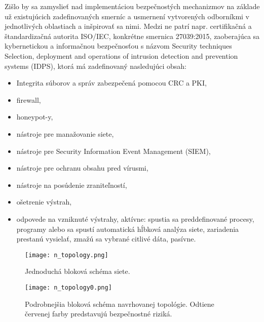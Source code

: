 \documentclass[12pt,a4paper,oneside,openright]{report}
\begin{document}
Zišlo by sa zamyslieť nad implementáciou bezpečnostých mechanizmov na základe už existujúcich zadefinovaných smerníc a usmernení vytvorených odborníkmi v jednotlivých oblastiach a inšpirovať sa nimi. Medzi ne patrí napr. certifikačná a štandardizačná autorita ISO/IEC, konkrétne smernica 27039:2015, zaoberajúca sa kybernetickou a informačnou bezpečnosťou s názvom Security techniques Selection, deployment and operations of intrusion detection and prevention systems (IDPS)\cite{iso27039}, ktorá má zadefinovaný nasledujúci obsah:
\begin{itemize}
\item Integrita súborov a správ zabezpečená pomocou CRC a PKI,
\item firewall,
\item honeypot-y,
\item nástroje pre manažovanie siete,
\item nástroje pre Security Information Event Management (SIEM),
\item nástroje pre ochranu obsahu pred vírusmi,
\item nástroje na posúdenie zraniteľností,
\item ošetrenie výstrah,
\item odpovede na vzniknuté výstrahy,
\subitem aktívne: spustia sa preddefinované procesy, programy alebo sa spustí automatická hĺbková analýza siete, zariadenia prestanú vysielať, zmažú sa vybrané citlivé dáta,
\subitem pasívne.
\end{itemize}
\onehalfspacing


\begin{figure*}[h]
	\centering
	\texttt{[image: n\_topology.png]}
	\caption{Jednoduchá bloková schéma siete.}
	\label{f:o_blok_topology}
\end{figure*}

\begin{figure*}[h]
	\centering
	\texttt{[image: n\_topology0.png]}
	\caption{Podrobnejšia bloková schéma navrhovanej topológie. Odtiene červenej farby predstavujú bezpečnostné riziká.}
	\label{f:o_advanced_topology}
\end{figure*}
\end{document}
